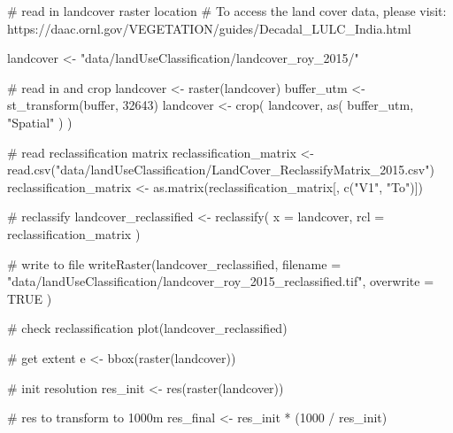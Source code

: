 \documentclass[
]{article}
\newenvironment{Shaded}{}{}
\newcommand{\CommentTok}[1]{\textcolor[rgb]{0.00,0.50,0.00}{#1}}
\newcommand{\DataTypeTok}[1]{#1}
\newcommand{\DecValTok}[1]{#1}
\newcommand{\KeywordTok}[1]{\textcolor[rgb]{0.00,0.00,1.00}{#1}}
\newcommand{\NormalTok}[1]{#1}
\newcommand{\OperatorTok}[1]{#1}
\newcommand{\OtherTok}[1]{\textcolor[rgb]{1.00,0.25,0.00}{#1}}
\newcommand{\StringTok}[1]{\textcolor[rgb]{0.00,0.50,0.50}{#1}}
\begin{document}
\begin{Shaded}
\begin{Highlighting}[]
\CommentTok{# read in landcover raster location}
\CommentTok{# To access the land cover data, please visit: https://daac.ornl.gov/VEGETATION/guides/Decadal_LULC_India.html}

\NormalTok{landcover <-}\StringTok{ "data/landUseClassification/landcover_roy_2015/"}

\CommentTok{# read in and crop}
\NormalTok{landcover <-}\StringTok{ }\KeywordTok{raster}\NormalTok{(landcover)}
\NormalTok{buffer_utm <-}\StringTok{ }\KeywordTok{st_transform}\NormalTok{(buffer, }\DecValTok{32643}\NormalTok{)}
\NormalTok{landcover <-}\StringTok{ }\KeywordTok{crop}\NormalTok{(}
\NormalTok{  landcover,}
  \KeywordTok{as}\NormalTok{(}
\NormalTok{    buffer_utm,}
    \StringTok{"Spatial"}
\NormalTok{  )}
\NormalTok{)}

\CommentTok{# read reclassification matrix}
\NormalTok{reclassification_matrix <-}\StringTok{ }\KeywordTok{read.csv}\NormalTok{(}\StringTok{"data/landUseClassification/LandCover_ReclassifyMatrix_2015.csv"}\NormalTok{)}
\NormalTok{reclassification_matrix <-}\StringTok{ }\KeywordTok{as.matrix}\NormalTok{(reclassification_matrix[, }\KeywordTok{c}\NormalTok{(}\StringTok{"V1"}\NormalTok{, }\StringTok{"To"}\NormalTok{)])}

\CommentTok{# reclassify}
\NormalTok{landcover_reclassified <-}\StringTok{ }\KeywordTok{reclassify}\NormalTok{(}
  \DataTypeTok{x =}\NormalTok{ landcover,}
  \DataTypeTok{rcl =}\NormalTok{ reclassification_matrix}
\NormalTok{)}

\CommentTok{# write to file}
\KeywordTok{writeRaster}\NormalTok{(landcover_reclassified,}
  \DataTypeTok{filename =} \StringTok{"data/landUseClassification/landcover_roy_2015_reclassified.tif"}\NormalTok{,}
  \DataTypeTok{overwrite =} \OtherTok{TRUE}
\NormalTok{)}

\CommentTok{# check reclassification}
\KeywordTok{plot}\NormalTok{(landcover_reclassified)}

\CommentTok{# get extent}
\NormalTok{e <-}\StringTok{ }\KeywordTok{bbox}\NormalTok{(}\KeywordTok{raster}\NormalTok{(landcover))}

\CommentTok{# init resolution}
\NormalTok{res_init <-}\StringTok{ }\KeywordTok{res}\NormalTok{(}\KeywordTok{raster}\NormalTok{(landcover))}

\CommentTok{# res to transform to 1000m}
\NormalTok{res_final <-}\StringTok{ }\NormalTok{res_init }\OperatorTok{*}\StringTok{ }\NormalTok{(}\DecValTok{1000} \OperatorTok{/}\StringTok{ }\NormalTok{res_init)}


\end{Highlighting}
\end{Shaded}
\end{document}
